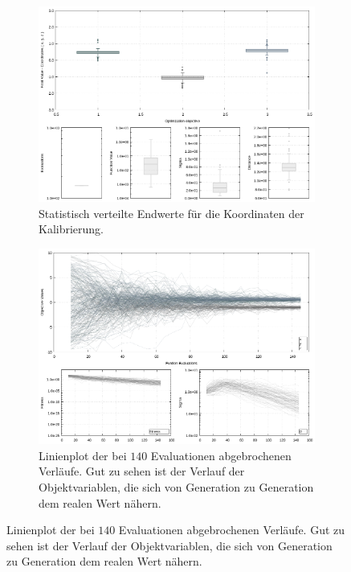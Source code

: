 %
\begin{figure}[!ht]
     \centering
     \begin{subfigure}[t]{0.45\textwidth}
             \centering
             \includegraphics[width=\textwidth]{img/calibration/aborted_calibration_ant0-boxes.png}
             \caption{Statistisch verteilte Endwerte für die Koordinaten der Kalibrierung.}
             \label{fig:abortedFinal_Calibration_Ant0_ES-boxes}
     \end{subfigure}
%
\qquad         
%
     \begin{subfigure}[t]{0.45\textwidth}
             \centering
             \includegraphics[width=\textwidth]{img/calibration/aborted_calibration_ant0-lines.png}
             \caption{Linienplot der bei $140$ Evaluationen abgebrochenen Verläufe. Gut zu sehen ist der Verlauf der Objektvariablen, die sich von Generation zu Generation dem realen Wert nähern.}

\end{subfigure}
\end{figure}
